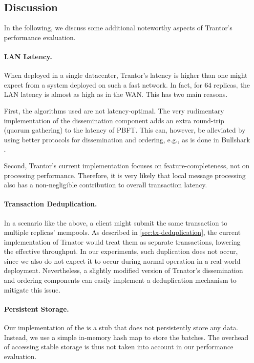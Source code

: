 \documentclass{article}
\begin{document}
\subsection{Discussion}

In the following, we discuss some additional noteworthy aspects of Trantor's performance evaluation.

\paragraph{LAN Latency.}
When deployed in a single datacenter, Trantor's latency is higher than one might expect from a system deployed on such a fast network.
In fact, for 64 replicas, the LAN latency is almost as high as in the WAN.
This has two main reasons.

First, the algorithms used are not latency-optimal.
The very rudimentary implementation of the dissemination component adds an extra round-trip (quorum gathering) to the latency of PBFT.
This can, however, be alleviated by using better protocols for dissemination and ordering, e.g., as is done in Bullshark \cite{bullshark}.

Second, Trantor's current implementation focuses on feature-completeness, not on processing performance.
Therefore, it is very likely that local message processing also has a non-negligible contribution to overall transaction latency.

\paragraph{Transaction Deduplication.}
In a scenario like the above, a client might submit the same transaction to multiple replicas' mempools.
As described in \cref{sec:tx-deduplication}, the current implementation of Trnator would treat them as separate transactions,
lowering the effective throughput.
In our experiments, such duplication does not occur, since we also do not expect it to occur during normal operation in a real-world deployment.
Nevertheless, a slightly modified version of Trnator's dissemination and ordering components
can easily implement a deduplication mechanism \cite{mirbft,iss} to mitigate this issue.

\paragraph{Persistent Storage.}
Our implementation of the  is a stub that does not persistently store any data.
Instead, we use a simple in-memory hash map to store the batches.
The overhead of accessing stable storage is thus not taken into account in our performance evaluation.
\end{document}
